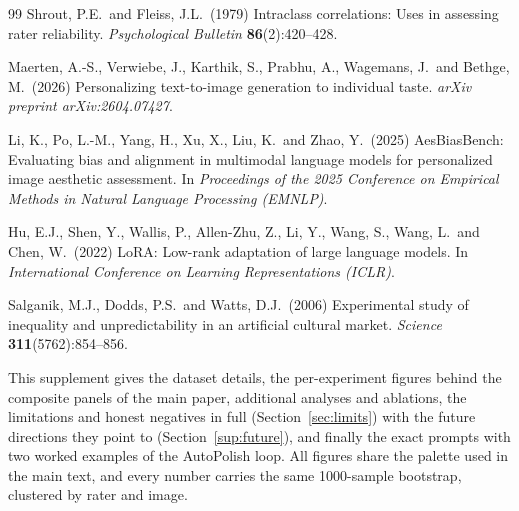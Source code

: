 \documentclass[10pt,twocolumn,letterpaper]{article}
\begin{document}
\begin{thebibliography}{99}
Shrout, P.E.\ and Fleiss, J.L.\ (1979)
Intraclass correlations: Uses in assessing rater reliability.
{\it Psychological Bulletin} {\bf 86}(2):420--428.

Maerten, A.-S., Verwiebe, J., Karthik, S., Prabhu, A., Wagemans, J.\ and Bethge, M.\ (2026)
Personalizing text-to-image generation to individual taste.
{\it arXiv preprint arXiv:2604.07427}.

Li, K., Po, L.-M., Yang, H., Xu, X., Liu, K.\ and Zhao, Y.\ (2025)
AesBiasBench: Evaluating bias and alignment in multimodal language models for personalized
image aesthetic assessment.
In {\it Proceedings of the 2025 Conference on Empirical Methods in Natural Language
Processing (EMNLP)}.

Hu, E.J., Shen, Y., Wallis, P., Allen-Zhu, Z., Li, Y., Wang, S., Wang, L.\ and Chen, W.\ (2022)
LoRA: Low-rank adaptation of large language models.
In {\it International Conference on Learning Representations (ICLR)}.

Salganik, M.J., Dodds, P.S.\ and Watts, D.J.\ (2006)
Experimental study of inequality and unpredictability in an artificial cultural market.
{\it Science} {\bf 311}(5762):854--856.

\end{thebibliography}
\endgroup


\ifdefined\mainonly\else
\clearpage
\setcounter{page}{1}
\maketitlesupplementary

\appendix
\setcounter{section}{0}
\renewcommand{\thesection}{S\arabic{section}}
\setcounter{figure}{0}
\renewcommand{\thefigure}{S\arabic{figure}}
\setcounter{table}{0}
\renewcommand{\thetable}{S\arabic{table}}

This supplement gives the dataset details, the per-experiment figures behind the composite panels of the main paper, additional analyses and ablations, the limitations and honest negatives in full (Section~\ref{sec:limits}) with the future directions they point to (Section~\ref{sup:future}), and finally the exact prompts with two worked examples of the AutoPolish loop. All figures share the palette used in the main text, and every number carries the same 1000-sample bootstrap, clustered by rater and image.
\end{document}
